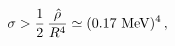 \begin{equation}
\sigma > \frac{1}{2}\,\frac{\hat\rho}{R^4} 
\simeq (0.17\,\,{\rm MeV})^4\,,\end{equation}

